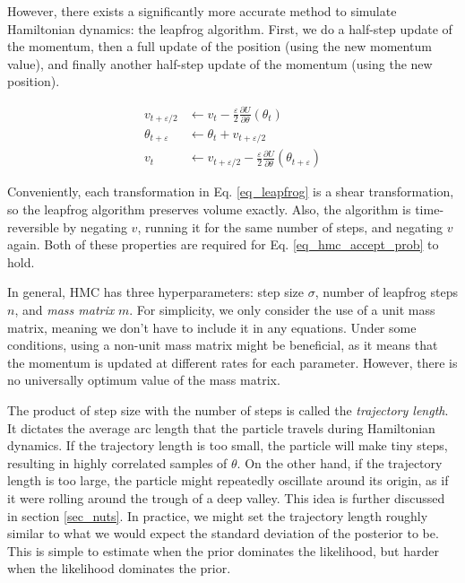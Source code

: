 \documentclass[12pt]{article}
\begin{document}
However, there exists a significantly more accurate method to simulate Hamiltonian dynamics: the leapfrog algorithm. \cite{hmc} First, we do a half-step update of the momentum, then a full update of the position (using the new momentum value), and finally another half-step update of the momentum (using the new position).

\begin{align}
v_{t+\varepsilon/2} &\leftarrow v_t - \frac{\varepsilon}{2} \frac{\partial U}{\partial \theta}(\theta_t) \\
\theta_{t+\varepsilon} &\leftarrow \theta_t + v_{t+\varepsilon/2} \\
v_t &\leftarrow v_{t+\varepsilon/2} - \frac{\varepsilon}{2} \frac{\partial U}{\partial \theta}(\theta_{t+\varepsilon})
\end{align}
\label{eq_leapfrog}

Conveniently, each transformation in Eq. \ref{eq_leapfrog} is a shear transformation, so the leapfrog algorithm preserves volume exactly. Also, the algorithm is time-reversible by negating $v$, running it for the same number of steps, and negating $v$ again. Both of these properties are required for Eq. \ref{eq_hmc_accept_prob} to hold. \cite{hmc}

In general, HMC has three hyperparameters: step size $\sigma$, number of leapfrog steps $n$, and \textit{mass matrix} $m$. For simplicity, we only consider the use of a unit mass matrix, meaning we don't have to include it in any equations. Under some conditions, using a non-unit mass matrix might be beneficial, as it means that the momentum is updated at different rates for each parameter. However, there is no universally optimum value of the mass matrix.

The product of step size with the number of steps is called the \textit{trajectory length}. It dictates the average arc length that the particle travels during Hamiltonian dynamics. If the trajectory length is too small, the particle will make tiny steps, resulting in highly correlated samples of $\theta$. On the other hand, if the trajectory length is too large, the particle might repeatedly oscillate around its origin, as if it were rolling around the trough of a deep valley. This idea is further discussed in section \ref{sec_nuts}. In practice, we might set the trajectory length roughly similar to what we would expect the standard deviation of the posterior to be. \cite{bnn_posteriors} This is simple to estimate when the prior dominates the likelihood, but harder when the likelihood dominates the prior.
\end{document}
